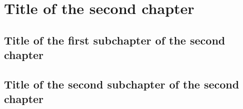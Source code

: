 \chapter{Title of the second chapter}

\section{Title of the first subchapter of the second chapter}

\section{Title of the second subchapter of the second chapter}
